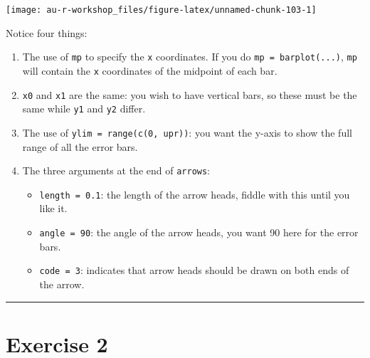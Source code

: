\documentclass[]{book}
\providecommand{\tightlist}{%
  \setlength{\itemsep}{0pt}\setlength{\parskip}{0pt}}
\theoremstyle{definition}
\theoremstyle{definition}
\theoremstyle{definition}
\theoremstyle{remark}
\begin{document}
\begin{center}\texttt{[image: au-r-workshop\_files/figure-latex/unnamed-chunk-103-1]} \end{center}

Notice four things:

\begin{enumerate}
\def\labelenumi{\arabic{enumi}.}
\tightlist
\item
  The use of \texttt{mp} to specify the \texttt{x} coordinates. If you
  do \texttt{mp\ =\ barplot(...)}, \texttt{mp} will contain the
  \texttt{x} coordinates of the midpoint of each bar.
\item
  \texttt{x0} and \texttt{x1} are the same: you wish to have vertical
  bars, so these must be the same while \texttt{y1} and \texttt{y2}
  differ.
\item
  The use of \texttt{ylim\ =\ range(c(0,\ upr))}: you want the y-axis to
  show the full range of all the error bars.
\item
  The three arguments at the end of \texttt{arrows}:

  \begin{itemize}
  \tightlist
  \item
    \texttt{length\ =\ 0.1}: the length of the arrow heads, fiddle with
    this until you like it.
  \item
    \texttt{angle\ =\ 90}: the angle of the arrow heads, you want 90
    here for the error bars.
  \item
    \texttt{code\ =\ 3}: indicates that arrow heads should be drawn on
    both ends of the arrow.
  \end{itemize}
\end{enumerate}

\begin{center}\rule{0.5\linewidth}{\linethickness}\end{center}

\hypertarget{ex2}{\section*{Exercise 2}\label{ex2}}
\end{document}
